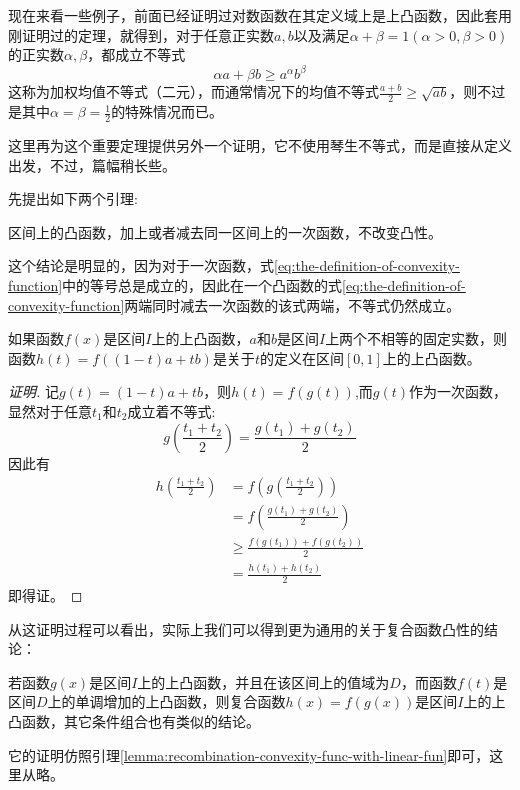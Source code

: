 现在来看一些例子，前面已经证明过对数函数在其定义域上是上凸函数，因此套用刚证明过的定理，就得到，对于任意正实数$a,b$以及满足$\alpha+\beta=1(\alpha>0,\beta>0)$的正实数$\alpha,\beta$，都成立不等式
\begin{equation}
  \label{eq:binary-neq-for-mean-with-weight}
\alpha a + \beta b \geqslant a^{\alpha}b^{\beta}
\end{equation}
这称为加权均值不等式（二元），而通常情况下的均值不等式$\frac{a+b}{2}\geqslant \sqrt{ab}$，则不过是其中$\alpha=\beta=\frac{1}{2}$的特殊情况而已。

这里再为这个重要定理提供另外一个证明，它不使用琴生不等式，而是直接从定义出发，不过，篇幅稍长些。

先提出如下两个引理:
\begin{lemma}
  \label{lemma:add-linear-fun-to-convexity-funtion}
  区间上的凸函数，加上或者减去同一区间上的一次函数，不改变凸性。
\end{lemma}
这个结论是明显的，因为对于一次函数，式\ref{eq:the-definition-of-convexity-function}中的等号总是成立的，因此在一个凸函数的式\ref{eq:the-definition-of-convexity-function}两端同时减去一次函数的该式两端，不等式仍然成立。

\begin{lemma}
  \label{lemma:recombination-convexity-func-with-linear-fun}
如果函数$f(x)$是区间$I$上的上凸函数，$a$和$b$是区间$I$上两个不相等的固定实数，则函数$h(t)=f((1-t)a+tb)$是关于$t$的定义在区间$[0,1]$上的上凸函数。
\end{lemma}
\begin{proof}[证明]
 记$g(t)=(1-t)a+tb$，则$h(t)=f(g(t))$,而$g(t)$作为一次函数，显然对于任意$t_1$和$t_2$成立着不等式:
\[ g \left( \frac{t_1+t_2}{2} \right)=\frac{g(t_1)+g(t_2)}{2} \] 
因此有
\begin{align*}
  h \left( \frac{t_1+t_2}{2} \right) &= f \left( g\left( \frac{t_1+t_2}{2} \right) \right) \\
& = f \left( \frac{g(t_1)+g(t_2)}{2} \right) \\
& \geqslant \frac{f(g(t_1))+f(g(t_2))}{2} \\
& = \frac{h(t_1)+h(t_2)}{2}
\end{align*}
即得证。
\end{proof}

从这证明过程可以看出，实际上我们可以得到更为通用的关于复合函数凸性的结论：
\begin{theorem}
  若函数$g(x)$是区间$I$上的上凸函数，并且在该区间上的值域为$D$，而函数$f(t)$是区间$D$上的单调增加的上凸函数，则复合函数$h(x)=f(g(x))$是区间$I$上的上凸函数，其它条件组合也有类似的结论。
\end{theorem}
它的证明仿照引理\ref{lemma:recombination-convexity-func-with-linear-fun}即可，这里从略。

